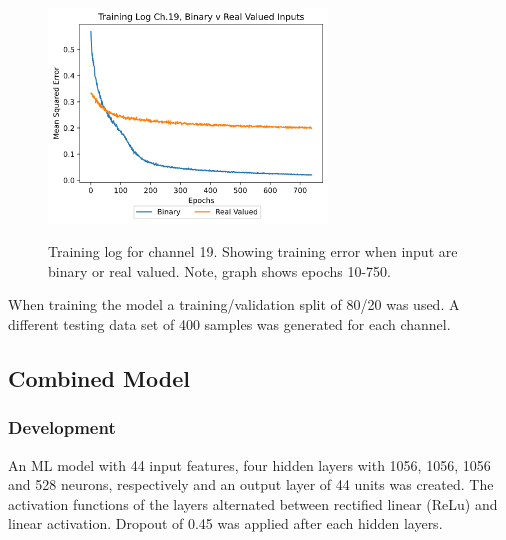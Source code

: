 \begin{figure}[h]
    \centering
    \caption{Training log for channel 19. Showing training error when input are binary or real valued. Note, graph shows epochs 10-750.   }
    \includegraphics[width=0.66\textwidth]{project/img/ml_model/real_valued_binary.png}
    \label{fig:bin_rv_ip}
\end{figure}

When training the model a training/validation split of 80/20 was used. A different testing data set of 400 samples was generated for each channel. 

\FloatBarrier
\subsection{Combined Model} \label{sub:sec:comb_mod}

\subsubsection{Development}


An ML model with 44 input features, four hidden layers with 1056, 1056, 1056 and 528 neurons, respectively and an output layer of 44 units was created. The activation functions of the layers alternated between rectified linear (ReLu) and linear activation.  Dropout of 0.45 was applied after each hidden layers.


